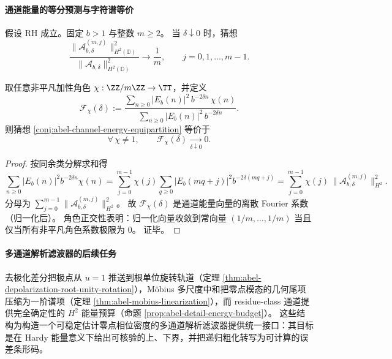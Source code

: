 \paragraph{通道能量的等分预测与字符谱等价}
\begin{conjecture}[对数尺度粗化下的通道能量等分]\label{conj:abel-channel-energy-equipartition}
假设 RH 成立。固定 \(b>1\) 与整数 \(m\ge 2\)。
当 \(\delta\downarrow 0\) 时，猜想
\[
\boxed{\ \frac{\|\mathcal A_{b,\delta}^{(m,j)}\|_{H^2(\mathbb D)}^2}{\|\mathcal A_{b,\delta}\|_{H^2(\mathbb D)}^2}\longrightarrow \frac1m,
\qquad j=0,1,\dots,m-1.\ }
\]
\end{conjecture}

\begin{proposition}[字符谱等价刻画]\label{prop:abel-channel-equipartition-character}
取任意非平凡加性角色 \(\chi:\ZZ/m\ZZ\to\TT\)，并定义
\[
\boxed{\ \mathcal F_\chi(\delta):=
\frac{\sum_{n\ge 0}|E_b(n)|^2\,b^{-2\delta n}\,\chi(n)}
{\sum_{n\ge 0}|E_b(n)|^2\,b^{-2\delta n}}.\ }
\]
则猜想 \ref{conj:abel-channel-energy-equipartition} 等价于
\[
\forall\,\chi\neq 1,\qquad \mathcal F_\chi(\delta)\xrightarrow[\delta\downarrow 0]{}0.
\]
\end{proposition}
\begin{proof}
按同余类分解求和得
\[
\sum_{n\ge 0}|E_b(n)|^2b^{-2\delta n}\chi(n)
=\sum_{j=0}^{m-1}\chi(j)\sum_{q\ge 0}|E_b(mq+j)|^2b^{-2\delta(mq+j)}
=\sum_{j=0}^{m-1}\chi(j)\,\|\mathcal A_{b,\delta}^{(m,j)}\|_{H^2}^2.
\]
分母为 \(\sum_{j=0}^{m-1}\|\mathcal A_{b,\delta}^{(m,j)}\|_{H^2}^2\)。
故 \(\mathcal F_\chi(\delta)\) 是通道能量向量的离散 Fourier 系数（归一化后）。
角色正交性表明：归一化向量收敛到常向量 \((1/m,\dots,1/m)\) 当且仅当所有非平凡角色系数极限为 \(0\)。
证毕。
\end{proof}



\paragraph{多通道解析滤波器的后续任务}
去极化差分把极点从 \(u=1\) 推送到根单位旋转轨道（定理 \ref{thm:abel-depolarization-root-unity-rotation}），Möbius 多尺度中和把零点模态的几何尾项压缩为一阶谱项（定理 \ref{thm:abel-mobius-linearization}），而 residue-class 通道提供完全确定性的 \(H^2\) 能量预算（命题 \ref{prop:abel-detail-energy-budget}）。
这些结构为构造一个可稳定估计零点相位密度的多通道解析滤波器提供统一接口：其目标是在 Hardy 能量意义下给出可核验的上、下界，并把递归粗化转写为可计算的误差条形码。

\endinput
